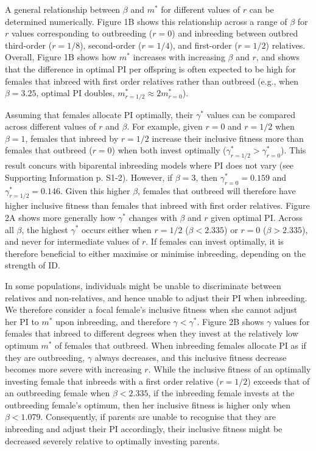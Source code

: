 \documentclass[12pt]{article}
\begin{document}
A general relationship between $\beta$ and $m^{*}$ for different values of $r$ can be determined numerically. Figure 1B shows this relationship across a range of $\beta$ for $r$ values corresponding to outbreeding ($r=0$) and inbreeding between outbred third-order ($r=1/8$), second-order ($r=1/4$), and first-order ($r=1/2$) relatives. Overall, Figure 1B shows how $m^{*}$ increases with increasing $\beta$ and $r$, and shows that the difference in optimal PI per offspring is often expected to be high for females that inbreed with first order relatives rather than outbreed (e.g., when $\beta=3.25$, optimal PI doubles, $m^{*}_{r=1/2} \approx 2m^{*}_{r=0}$).

Assuming that females allocate PI optimally, their $\gamma^{*}$ values can be compared across different values of $r$ and $\beta$. For example, given $r=0$ and $r=1/2$ when $\beta=1$, females that inbreed by $r=1/2$ increase their inclusive fitness more than females that outbreed ($r=0$) when both invest optimally ($\gamma^{*}_{r=1/2}>\gamma^{*}_{r=0}$). This result concurs with biparental inbreeding models where PI does not vary (see Supporting Information p. S1-2). However, if $\beta=3$, then $\gamma^{*}_{r=0}=0.159$ and $\gamma^{*}_{r=1/2}=0.146$. Given this higher $\beta$, females that outbreed will therefore have higher inclusive fitness than females that inbreed with first order relatives. Figure 2A shows more generally how $\gamma^{*}$ changes with $\beta$ and $r$ given optimal PI. Across all $\beta$, the highest $\gamma^{*}$ occurs either when $r=1/2$ ($\beta < 2.335$) or $r=0$ ($\beta > 2.335$), and never for intermediate values of $r$. If females can invest optimally, it is therefore beneficial to either maximise or minimise inbreeding, depending on the strength of ID.

In some populations, individuals might be unable to discriminate between relatives and non-relatives, and hence unable to adjust their PI when inbreeding. We therefore consider a focal female's inclusive fitness when she cannot adjust her PI to $m^{*}$ upon inbreeding, and therefore $\gamma < \gamma^{*}$. Figure 2B shows $\gamma$ values for females that inbreed to different degrees when they invest at the relatively low optimum $m^{*}$ of females that outbreed. When inbreeding females allocate PI as if they are outbreeding, $\gamma$ always decreases, and this inclusive fitness decrease becomes more severe with increasing $r$. While the inclusive fitness of an optimally investing female that inbreeds with a first order relative ($r=1/2$) exceeds that of an outbreeding female when $\beta < 2.335$, if the inbreeding female invests at the outbreeding female's optimum, then her inclusive fitness is higher only when $\beta < 1.079$. Consequently, if parents are unable to recognise that they are inbreeding and adjust their PI accordingly, their inclusive fitness might be decreased severely relative to optimally investing parents. 
\end{document}

